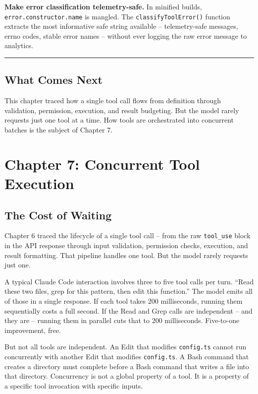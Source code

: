 \documentclass[
  english,
  11pt,
  letterpaper,
]{book}
\begin{document}
\textbf{Make error classification telemetry-safe.} In minified builds,
\texttt{error.constructor.name} is mangled. The
\texttt{classifyToolError()} function extracts the most informative safe
string available -- telemetry-safe messages, errno codes, stable error
names -- without ever logging the raw error message to analytics.

\begin{center}\rule{0.5\linewidth}{0.5pt}\end{center}

\section{What Comes Next}\label{what-comes-next}

This chapter traced how a single tool call flows from definition through
validation, permission, execution, and result budgeting. But the model
rarely requests just one tool at a time. How tools are orchestrated into
concurrent batches is the subject of Chapter 7.

\chapter{Chapter 7: Concurrent Tool
Execution}\label{chapter-7-concurrent-tool-execution}

\section{The Cost of Waiting}\label{the-cost-of-waiting}

Chapter 6 traced the lifecycle of a single tool call -- from the raw
\texttt{tool\_use} block in the API response through input validation,
permission checks, execution, and result formatting. That pipeline
handles one tool. But the model rarely requests just one.

A typical Claude Code interaction involves three to five tool calls per
turn. ``Read these two files, grep for this pattern, then edit this
function.'' The model emits all of those in a single response. If each
tool takes 200 milliseconds, running them sequentially costs a full
second. If the Read and Grep calls are independent -- and they are --
running them in parallel cuts that to 200 milliseconds. Five-to-one
improvement, free.

But not all tools are independent. An Edit that modifies
\texttt{config.ts} cannot run concurrently with another Edit that
modifies \texttt{config.ts}. A Bash command that creates a directory
must complete before a Bash command that writes a file into that
directory. Concurrency is not a global property of a tool. It is a
property of a specific tool invocation with specific inputs.
\end{document}

